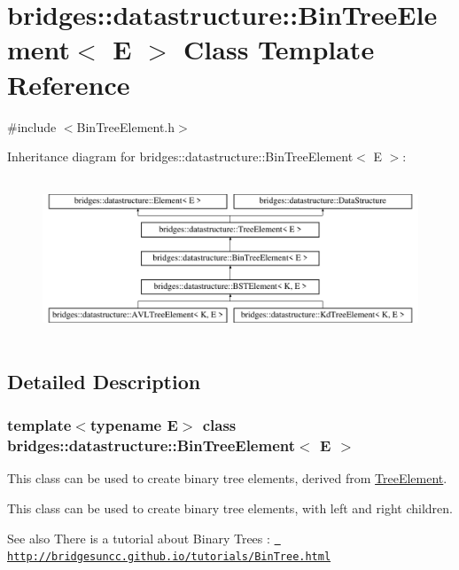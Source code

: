 \hypertarget{classbridges_1_1datastructure_1_1_bin_tree_element}{}\section{bridges\+::datastructure\+::Bin\+Tree\+Element$<$ E $>$ Class Template Reference}
\label{classbridges_1_1datastructure_1_1_bin_tree_element}


{\ttfamily \#include $<$Bin\+Tree\+Element.\+h$>$}

Inheritance diagram for bridges\+::datastructure\+::Bin\+Tree\+Element$<$ E $>$\+:\begin{figure}[H]
\begin{center}
\leavevmode
\includegraphics[height=4.794520cm]{classbridges_1_1datastructure_1_1_bin_tree_element}
\end{center}
\end{figure}


\subsection{Detailed Description}
\subsubsection*{template$<$typename E$>$\newline
class bridges\+::datastructure\+::\+Bin\+Tree\+Element$<$ E $>$}

This class can be used to create binary tree elements, derived from \mbox{\hyperlink{classbridges_1_1datastructure_1_1_tree_element}{Tree\+Element}}. 

This class can be used to create binary tree elements, with left and right children.

\begin{DoxySeeAlso}{See also}
There is a tutorial about Binary Trees \+: \href{http://bridgesuncc.github.io/tutorials/BinTree.html}{\texttt{ http\+://bridgesuncc.\+github.\+io/tutorials/\+Bin\+Tree.\+html}}
\end{DoxySeeAlso}

